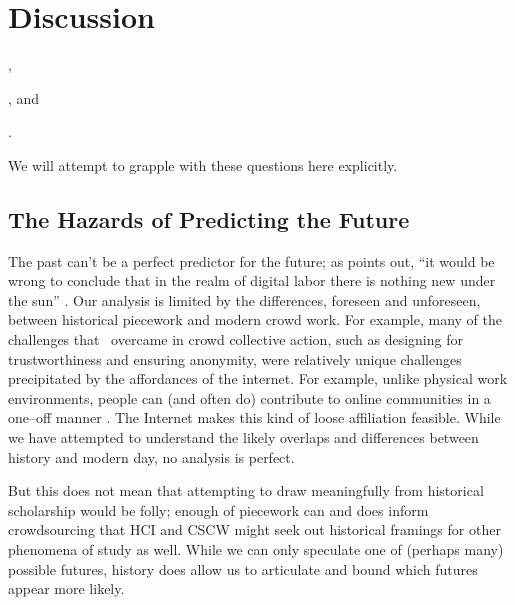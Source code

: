 \documentclass[trackingWork]{subfiles}
\begin{document}
\section{Discussion}
\begin{inlinelist}
  \item {},
  \item {}, and
  \item {}.
\end{inlinelist}
We will attempt to grapple with these questions here explicitly.


\subsection{The Hazards of Predicting the Future}\label{sec:perilousProblemsPredicting}
The past can't be a perfect predictor for the future;
as \cite{scholz2012digital} points out,
``it would be wrong to conclude that
in the realm of digital labor
there is nothing new under the sun''
\cite{scholz2012digital}.
Our analysis is limited by the differences, foreseen and unforeseen, between historical piecework and modern crowd work.
For example, many of the challenges that \DO~overcame in crowd collective action, such as designing for trustworthiness and ensuring anonymity, were relatively unique challenges precipitated by the affordances of the internet.
For example, unlike physical work environments, people can (and often do) contribute to online communities in a one--off manner
\cite{mcinnis2016one}.
The Internet makes this kind of loose affiliation feasible.
While we have attempted to understand the likely overlaps and differences between history and modern day, no analysis is perfect.


But this does not mean that
attempting to draw meaningfully from historical scholarship would be folly;
enough of piecework can and does inform crowdsourcing that
HCI and CSCW might seek out historical framings for other phenomena of study as well.
While we can only speculate one of (perhaps many) possible futures, history does allow us to articulate and bound which futures appear more likely.
\end{document}
